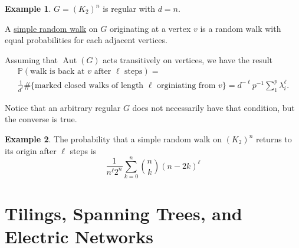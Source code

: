 \documentclass{report}
\newcommand{\matP}{\mathbb{P}}
\def \Aut {\operatorname{Aut}}
\theoremstyle{definition}
\newtheorem{example}{Example}[section]
\theoremstyle{remark}
\numberwithin{equation}{section}
\begin{document}
\begin{example}
$G = (K_2)^n$ is regular with $d = n.$
\end{example}

A \underline{simple random walk} on $G$ originating at a vertex $v$ is a random walk with equal probabilities for each adjacent vertices.

Assuming that $\Aut(G)$ acts transitively on vertices, we have the result
\begin{multline*}
    \matP\left(\text{walk is back at $v$ after $\ell$ steps}\right) = \\\frac{1}{d^\ell} \#\{\text{marked closed walks of length $\ell$ orginiating from $v$}\} 
    = d^{-\ell} p^{-1} \sum_1^p \lambda_i^\ell.
\end{multline*}


Notice that an arbitrary regular $G$ does not necessarily have that condition, but the converse is true.

\begin{example}
The probability that a simple random walk on $(K_2)^n$ returns to its origin after $\ell $ steps is
\[
\frac{1}{n^\ell 2^n} \sum_{k = 0}^n \binom{n}{k} (n - 2k)^\ell
\]
\end{example}


\chapter{Tilings, Spanning Trees, and Electric Networks}
\end{document}
